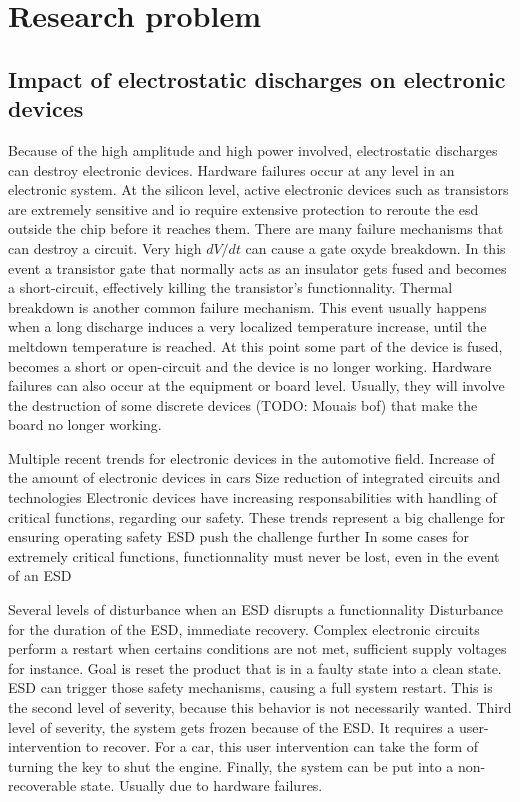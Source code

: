 \section{Research problem}
\subsection{Impact of electrostatic discharges on electronic devices}


Because of the high amplitude and high power involved, electrostatic discharges can destroy electronic devices.
Hardware failures occur at any level in an electronic system.
At the silicon level, active electronic devices such as transistors are extremely sensitive and \gls{io} require extensive protection to reroute the \gls{esd} outside the chip before it reaches them.
There are many failure mechanisms that can destroy a circuit.
Very high $dV/dt$ can cause a gate oxyde breakdown.
In this event a transistor gate that normally acts as an insulator gets fused and becomes a short-circuit, effectively killing the transistor's functionnality.
Thermal breakdown is another common failure mechanism.
This event usually happens when a long discharge induces a very localized temperature increase, until the meltdown temperature is reached.
At this point some part of the device is fused, becomes a short or open-circuit and the device is no longer working.
Hardware failures can also occur at the equipment or board level.
Usually, they will involve the destruction of some discrete devices (TODO: Mouais bof) that make the board no longer working.

Multiple recent trends for electronic devices in the automotive field.
Increase of the amount of electronic devices in cars
Size reduction of integrated circuits and technologies
Electronic devices have increasing responsabilities with handling of critical functions, regarding our safety.
These trends represent a big challenge for ensuring operating safety
ESD push the challenge further
In some cases for extremely critical functions, functionnality must never be lost, even in the event of an ESD

Several levels of disturbance when an ESD disrupts a functionnality
Disturbance for the duration of the ESD, immediate recovery.
Complex electronic circuits perform a restart when certains conditions are not met, sufficient supply voltages for instance.
Goal is reset the product that is in a faulty state into a clean state.
ESD can trigger those safety mechanisms, causing a full system restart.
This is the second level of severity, because this behavior is not necessarily wanted.
Third level of severity, the system gets frozen because of the ESD.
It requires a user-intervention to recover.
For a car, this user intervention can take the form of turning the key to shut the engine.
Finally, the system can be put into a non-recoverable state.
Usually due to hardware failures.

